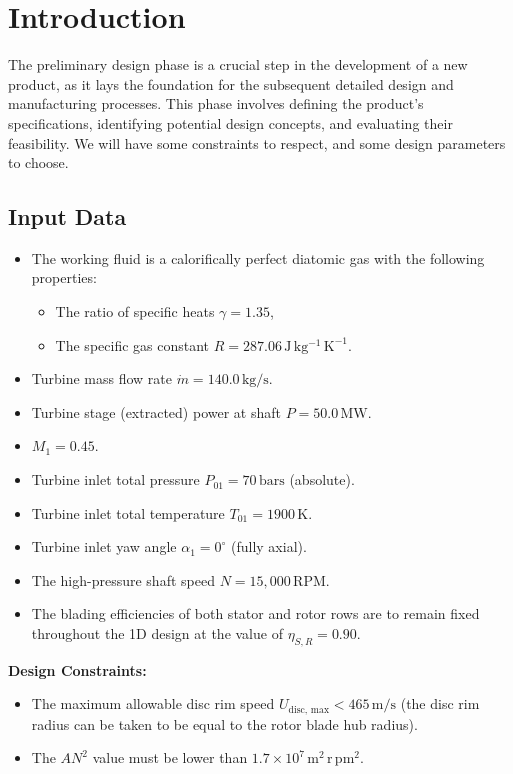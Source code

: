 \section{Introduction}
The preliminary design phase is a crucial step in the development of a new product, as it lays the foundation for the subsequent detailed design and manufacturing processes. This phase involves defining the product's specifications, identifying potential design concepts, and evaluating their feasibility. We will have some constraints to respect, and some design parameters to choose.
\subsection{Input Data}
\begin{itemize}
    \item The working fluid is a calorifically perfect diatomic gas with the following properties:
    \begin{itemize}
        \item The ratio of specific heats $\gamma = 1.35$,
        \item The specific gas constant $R = 287.06 \, \mathrm{J \, kg^{-1} \, K^{-1}}$.
    \end{itemize}
    \item Turbine mass flow rate $\dot{m} = 140.0 \, \mathrm{kg/s}$.
    \item Turbine stage (extracted) power at shaft $P = 50.0 \, \mathrm{MW}$.
    \item $M_1 = 0.45$.
    \item Turbine inlet total pressure $P_{01} = 70 \, \mathrm{bars}$ (absolute).
    \item Turbine inlet total temperature $T_{01} = 1900 \, \mathrm{K}$.
    \item Turbine inlet yaw angle $\alpha_1 = 0^\circ$ (fully axial).
    \item The high-pressure shaft speed $N = 15,000 \, \mathrm{RPM}$.
    \item The blading efficiencies of both stator and rotor rows are to remain fixed throughout the 1D design at the value of $\eta_{S,R} = 0.90$.
\end{itemize}

\textbf{Design Constraints:}
\begin{itemize}
    \item The maximum allowable disc rim speed $U_{\text{disc, max}} < 465 \, \mathrm{m/s}$ (the disc rim radius can be taken to be equal to the rotor blade hub radius).
    \item The $AN^2$ value must be lower than $1.7 \times 10^7 \, \mathrm{m^2 \, r \, pm^2}$.
\end{itemize}

